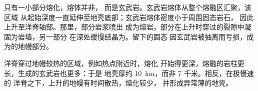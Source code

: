 只有一小部分熔化，熔体并非，
而是玄武岩。玄武岩熔体从整个熔融区汇聚，该区域
从起始深度一直延伸至地壳底部；玄武岩熔体密度小于周围固态岩石，
因此上升至洋脊轴部。那里，部分岩浆喷出
成为熔岩，部分在上升时穿过的裂隙中凝固为岩墙，另一部分
在深处缓慢结晶为。留下的固态
因玄武岩被抽离而亏损，成为的地幔部分。

洋脊穿过地幔较热的区域，例如热点附近时，熔化
开始得更深，熔融的岩柱更长，生成的玄武岩也更多：于是
地壳厚约 \qty{10}{km}，而非 7 千米。相反，在极慢速的
洋脊之下，上升的地幔有时间散热，熔化较少，
并形成异常薄的地壳。

